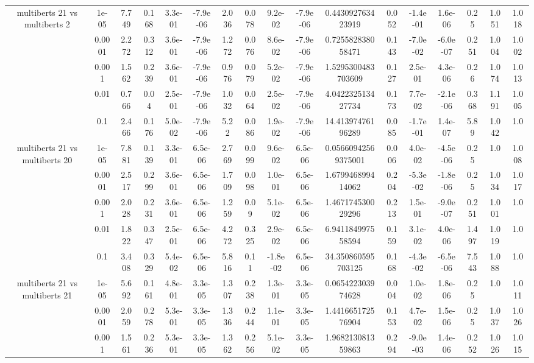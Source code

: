 \begin{tabular}{|c|c|c|c|c|c|c|c|c|c|c|c|c|c|c|c|c|}
\hline
\multirow{5}{*}{multiberts 21 vs multiberts 2} & 1e-05 & 7.749 & 0.168 & 3.3e-01 & -7.9e-06 & 2.036 & 0.078 & 9.2e-02 & -7.9e-06 & 0.443092763423919 & 0.052 & -1.4e-01 & 1.6e-06 & 0.25 & 1.051 & 1.018 \\
 & 0.0001 & 2.272 & 0.312 & 3.6e-01 & -7.9e-06 & 1.272 & 0.076 & 8.6e-02 & -7.9e-06 & 0.725582838058471 & 0.143 & -7.0e-02 & -6.0e-07 & 0.251 & 1.004 & 1.002 \\
 & 0.001 & 1.562 & 0.239 & 3.6e-01 & -7.9e-06 & 0.976 & 0.079 & 5.2e-02 & -7.9e-06 & 1.5295300483703609 & 0.127 & 2.5e-01 & 4.3e-06 & 0.26 & 1.074 & 1.013 \\
 & 0.01 & 0.766 & 0.04 & 2.5e-01 & -7.9e-06 & 1.032 & 0.064 & 2.5e-02 & -7.9e-06 & 4.042232513427734 & 0.173 & 7.7e-02 & -2.1e-06 & 0.368 & 1.191 & 1.005 \\
 & 0.1 & 2.466 & 0.176 & 5.0e-02 & -7.9e-06 & 5.22 & 0.086 & 1.9e-02 & -7.9e-06 & 14.41397476196289 & 0.085 & -1.7e-01 & 1.4e-07 & 5.89 & 1.042 & 1.0 \\
\hline
\multirow{5}{*}{multiberts 21 vs multiberts 20} & 1e-05 & 7.881 & 0.139 & 3.3e-01 & 6.5e-06 & 2.769 & 0.099 & 9.6e-02 & 6.5e-06 & 0.05660942569375001 & 0.006 & 4.0e-02 & -4.5e-06 & 0.25 & 1.0 & 1.008 \\
 & 0.0001 & 2.517 & 0.299 & 3.6e-01 & 6.5e-06 & 1.709 & 0.098 & 1.0e-01 & 6.5e-06 & 1.679946899414062 & 0.204 & -5.3e-02 & -1.8e-06 & 0.25 & 1.034 & 1.017 \\
 & 0.001 & 2.028 & 0.231 & 3.6e-01 & 6.5e-06 & 1.259 & 0.09 & 5.1e-02 & 6.5e-06 & 1.467174530029296 & 0.213 & 1.5e-01 & -9.0e-07 & 0.251 & 1.001 & 1.0 \\
 & 0.01 & 1.822 & 0.347 & 2.5e-01 & 6.5e-06 & 4.272 & 0.325 & 2.9e-02 & 6.5e-06 & 6.941184997558594 & 0.159 & 3.1e-02 & 4.0e-06 & 1.497 & 1.019 & 1.0 \\
 & 0.1 & 3.408 & 0.329 & 5.4e-02 & 6.5e-06 & 5.816 & 0.11 & -1.8e-02 & 6.5e-06 & 34.350860595703125 & 0.168 & -4.3e-02 & -6.5e-06 & 7.543 & 1.088 & 1.0 \\
\hline
\multirow{5}{*}{multiberts 21 vs multiberts 21} & 1e-05 & 5.692 & 0.161 & 4.8e-01 & 3.3e-05 & 1.307 & 0.238 & 1.3e-01 & 3.3e-05 & 0.065422303974628 & 0.004 & 1.0e-02 & 1.8e-06 & 0.25 & 1.0 & 1.011 \\
 & 0.0001 & 2.059 & 0.278 & 5.3e-01 & 3.3e-05 & 1.336 & 0.244 & 1.1e-01 & 3.3e-05 & 1.441665172576904 & 0.153 & 4.7e-02 & 1.5e-06 & 0.25 & 1.037 & 1.026 \\
 & 0.001 & 1.561 & 0.236 & 5.3e-01 & 3.3e-05 & 1.362 & 0.256 & 5.1e-02 & 3.3e-05 & 1.968213081359863 & 0.294 & -9.0e-03 & 1.4e-06 & 0.252 & 1.026 & 1.015 \\

\end{tabular}
